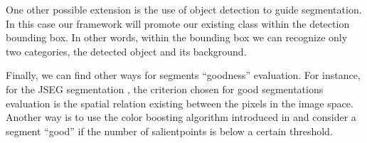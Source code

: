 \documentclass[10pt,twocolumn,letterpaper]{article}
\begin{document}
One other possible extension is the use of object detection to guide segmentation. In this case our
framework will promote our existing class within the detection bounding box. In other words, within
the bounding box we can recognize only two categories, the detected object and its background.

Finally, we can find other ways for segments ``goodness'' evaluation. For instance, for the JSEG segmentation
\cite{jseg:462311}, the criterion chosen for good segmentations evaluation is the spatial relation existing
between the pixels in the image space. Another way is to use the color boosting algorithm introduced in
\cite{Weijer05boostingcolor} and consider a segment ``good'' if the number of salientpoints is below a certain threshold.

{\small


}
\end{document}
